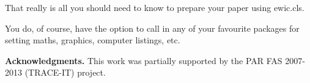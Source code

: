 \documentclass{ewic}
\begin{document}
			That really is all you should need to know to prepare your paper
			using ewic.cls.\citep{Mills2003}
			
			You do, of course, have the option to call in any of your
			favourite packages for setting maths, graphics, computer listings,
			etc.
			
			\textbf{Acknowledgments. }
			This work was partially supported by the PAR FAS 2007-2013 (TRACE-IT) project.
			
			
			
			
			
			
			
\end{document}
